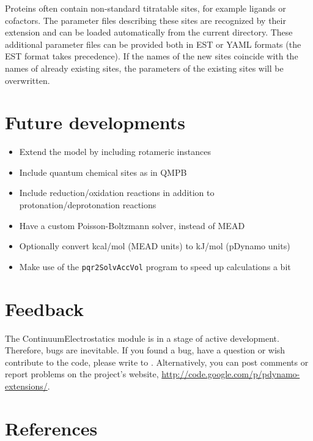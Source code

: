 \documentclass[a4paper,11pt]{article}
\newcommand{\modulename}{ContinuumElectrostatics\xspace}
\begin{document}
{Proteins often contain non-standard titratable sites, for example ligands or cofactors.
%
The parameter files describing these sites are recognized by their extension and can be
loaded automatically from the current directory.
%
These additional parameter files can be provided both in EST or YAML formats (the EST format
takes precedence).
%
If the names of the new sites coincide with the names of already existing sites, the
parameters of the existing sites will be overwritten.


\section{Future developments}
\linespread{0.8}

\begin{itemize}
\itemsep0pt 
  \item Extend the model by including rotameric instances
  \item Include quantum chemical sites as in QMPB
  \item Include reduction/oxidation reactions in addition to protonation/deprotonation reactions
  \item Have a custom Poisson-Boltzmann solver, instead of MEAD 
  \item Optionally convert kcal/mol (MEAD units) to kJ/mol (pDynamo units)
  \item Make use of the \texttt{pqr2SolvAccVol} program to speed up calculations a bit
\end{itemize}

\linespread{1.6}


\section{Feedback}
The \modulename module is in a stage of active development.
%
Therefore, bugs are inevitable.
%
If you found a bug, have a question or wish contribute to the code, 
please write to 
.
%
Alternatively, you can post comments or report problems on the project's website,
\url{http://code.google.com/p/pdynamo-extensions/}.


\section{References}
\renewcommand{\refname}{}
\vspace*{-1cm}

}
\end{document}
